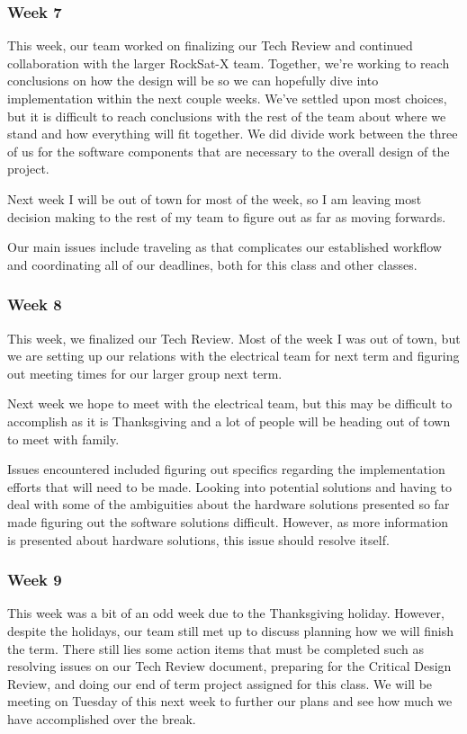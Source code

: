 \subsubsection{Week 7}
This week, our team worked on finalizing our Tech Review and continued collaboration with the larger RockSat-X team. 
Together, we're working to reach conclusions on how the design will be so we can hopefully dive into implementation 
within the next couple weeks. We've settled upon most choices, but it is difficult to reach conclusions with the rest 
of the team about where we stand and how everything will fit together. We did divide work between the three of us
for the software components that are necessary to the overall design of the project. 

Next week I will be out of town for most of the week, so I am leaving most decision making to the rest of my team to 
figure out as far as moving forwards.

Our main issues include traveling as that complicates our established workflow and coordinating all of our deadlines,
both for this class and other classes.

\subsubsection{Week 8}
This week, we finalized our Tech Review. Most of the week I was out of town, but we are setting up our relations with 
the electrical team for next term and figuring out meeting times for our larger group next term.

Next week we hope to meet with the electrical team, but this may be difficult to accomplish as it is Thanksgiving
and a lot of people will be heading out of town to meet with family.

Issues encountered included figuring out specifics regarding the implementation efforts that will need to be made.
Looking into potential solutions and having to deal with some of the ambiguities about the hardware solutions
presented so far made figuring out the software solutions difficult. However, as more information is
presented about hardware solutions, this issue should resolve itself.

\subsubsection{Week 9}
This week was a bit of an odd week due to the Thanksgiving holiday. However, despite the holidays, our team still met 
up to discuss planning how we will finish the term. There still lies some action items that must be completed such as 
resolving issues on our Tech Review document, preparing for the Critical Design Review, and doing our end of term 
project assigned for this class. We will be meeting on Tuesday of this next week to further our plans and see how 
much we have accomplished over the break.

